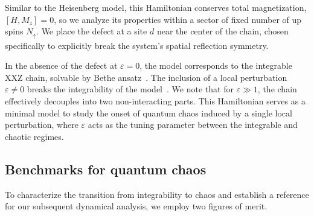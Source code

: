 \documentclass[letterpaper,superscriptaddress,aps,pra,nolongbibliography,showpacs,floatfix,dvipsnames,10pt,twocolumn]{revtex4-2}
\begin{document}
Similar to the Heisenberg model, this Hamiltonian conserves total
magnetization, $[H, M_z] = 0$, so we analyze its properties
within a 
sector of fixed number of up spins $N_{\uparrow}$.
We place the
defect at a site $d$ near the center of the chain, chosen specifically
to explicitly break the system's spatial reflection symmetry.

In the absence of the defect at $\varepsilon = 0$, the model corresponds
to the integrable XXZ chain, solvable by Bethe 
ansatz~\cite{bethe_1931_zur,baxter_2007_exactly}. 
The inclusion of a local perturbation $\varepsilon \neq 0$ breaks the
integrability of the 
model~\cite{santos_2004_integrability,brenes_2018_hightemperature,pandey_2020_adiabatic}. 
We note that for $\varepsilon \gg 1$, the chain effectively decouples into two 
non-interacting parts.
This Hamiltonian serves as a
minimal model to study the onset of quantum chaos induced by a
single local perturbation, 
where $\varepsilon$ acts as the tuning
parameter between the integrable and chaotic regimes.

\subsection{Benchmarks for quantum chaos}\label{sec:indicators}
To characterize the transition from integrability to chaos and establish a 
reference for our subsequent dynamical analysis, we employ two figures 
of merit.
\end{document}
